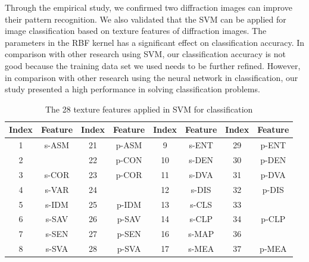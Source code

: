 Through the empirical study, we confirmed two diffraction images can improve their pattern recognition. We also validated that the SVM can be applied for image classification based on texture features of diffraction images. The parameters in the RBF kernel has a significant effect on classification accuracy. In comparison with other research using SVM, our classification accuracy is not good because the training data set we used needs to be further refined. However, in comparison with other research using the neural network in classification, our study presented a high performance in solving classification problems. 
\begin{table}[!t]
\begin{center}
\renewcommand{\arraystretch}{0.5}
\begin{tabular}{||c c c c c c c c||}
\hline
Index & Feature & Index & Feature & Index & Feature & Index & Feature\\[0.7ex]
\hline\hline
1 & s-ASM & 21 & p-ASM & 9 & s-ENT & 29 & p-ENT \\
2 & & 22 & p-CON & 10 & s-DEN & 30 & p-DEN \\
3 & s-COR & 23 & p-COR & 11 & s-DVA & 31 & p-DVA \\
4 & s-VAR & 24 & & 12 & s-DIS & 32 & p-DIS \\
5 & s-IDM & 25 & p-IDM & 13 & s-CLS & 33 & \\
6 & s-SAV & 26 & p-SAV & 14 & s-CLP & 34 & p-CLP \\
7 & s-SEN & 27 & p-SEN & 16 & s-MAP & 36 & \\
8 & s-SVA & 28 & p-SVA & 17 & s-MEA & 37 & p-MEA \\
\hline
\end{tabular}
\caption {The 28 texture features applied in SVM for classification}
\end{center}
\end{table}
    
